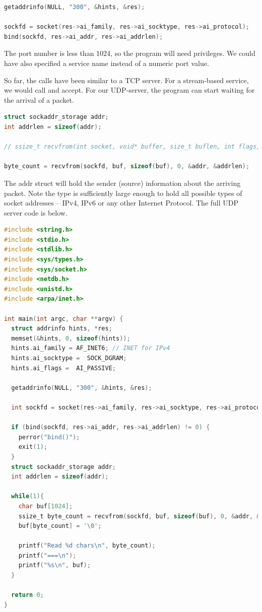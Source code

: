 \begin{lstlisting}[language=C]
getaddrinfo(NULL, "300", &hints, &res);

sockfd = socket(res->ai_family, res->ai_socktype, res->ai_protocol);
bind(sockfd, res->ai_addr, res->ai_addrlen);
\end{lstlisting}

The port number is less than 1024, so the program will need  privileges.
We could have also specified a service name instead of a numeric port value.

So far, the calls have been similar to a TCP server.
For a stream-based service, we would call  and accept.
For our UDP-server, the program can start waiting for the arrival of a packet.

\begin{lstlisting}[language=C]
struct sockaddr_storage addr;
int addrlen = sizeof(addr);

// ssize_t recvfrom(int socket, void* buffer, size_t buflen, int flags, struct sockaddr *addr, socklen_t * address_len);

byte_count = recvfrom(sockfd, buf, sizeof(buf), 0, &addr, &addrlen);
\end{lstlisting}

The addr struct will hold the sender (source) information about the arriving packet.
Note the  type is sufficiently large enough to hold all possible types of socket addresses -- IPv4, IPv6 or any other Internet Protocol.
The full UDP server code is below.

\begin{lstlisting}[language=C]
#include <string.h>
#include <stdio.h>
#include <stdlib.h>
#include <sys/types.h>
#include <sys/socket.h>
#include <netdb.h>
#include <unistd.h>
#include <arpa/inet.h>

int main(int argc, char **argv) {
  struct addrinfo hints, *res;
  memset(&hints, 0, sizeof(hints));
  hints.ai_family = AF_INET6; // INET for IPv4
  hints.ai_socktype =  SOCK_DGRAM;
  hints.ai_flags =  AI_PASSIVE;

  getaddrinfo(NULL, "300", &hints, &res);

  int sockfd = socket(res->ai_family, res->ai_socktype, res->ai_protocol);

  if (bind(sockfd, res->ai_addr, res->ai_addrlen) != 0) {
    perror("bind()");
    exit(1);
  }
  struct sockaddr_storage addr;
  int addrlen = sizeof(addr);

  while(1){
    char buf[1024];
    ssize_t byte_count = recvfrom(sockfd, buf, sizeof(buf), 0, &addr, &addrlen);
    buf[byte_count] = '\0';

    printf("Read %d chars\n", byte_count);
    printf("===\n");
    printf("%s\n", buf);
  }

  return 0;
}
\end{lstlisting}

